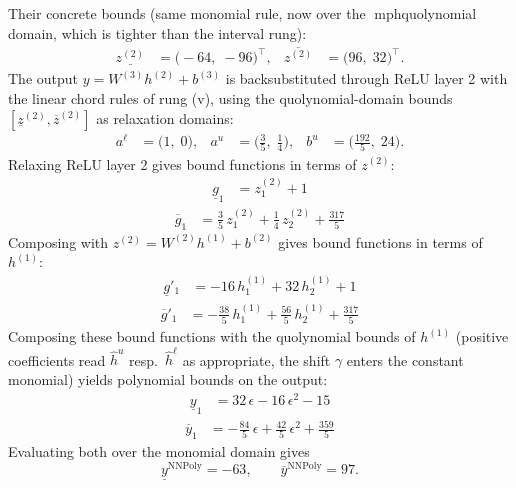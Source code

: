 \documentclass[11pt]{article}
\begin{document}
Their concrete bounds (same monomial rule, now over the mph{quolynomial} domain, which is tighter than the interval rung):
\begin{align*}
\underline{z^{(2)}} &= \bigl(-64,\; -96\bigr)^{\!\top}, & \overline{z^{(2)}} &= \bigl(96,\; 32\bigr)^{\!\top}.
\end{align*}
The output $y = W^{(3)} h^{(2)} + b^{(3)}$ is backsubstituted through ReLU layer 2 with the linear chord rules of rung (v), using the quolynomial-domain bounds
$[\underline{z}^{(2)}, \overline{z}^{(2)}]$ as relaxation domains:
\begin{align*}
a^{\ell} &= \bigl(1,\; 0\bigr), & a^{u} &= \bigl(\frac{3}{5},\; \frac{1}{4}\bigr), & b^{u} &= \bigl(\frac{192}{5},\; 24\bigr).
\end{align*}
Relaxing ReLU layer 2 gives bound functions in terms of $z^{(2)}$:
\begin{align*}
\underline{g}_{1} &= z^{(2)}_{1} + 1
\end{align*}
\begin{align*}
\overline{g}_{1} &= \frac{3}{5}\,z^{(2)}_{1} + \frac{1}{4}\,z^{(2)}_{2} + \frac{317}{5}
\end{align*}
Composing with $z^{(2)} = W^{(2)} h^{(1)} + b^{(2)}$ gives bound functions in terms of $h^{(1)}$:
\begin{align*}
\underline{g}'_{1} &= -16\,h^{(1)}_{1} + 32\,h^{(1)}_{2} + 1
\end{align*}
\begin{align*}
\overline{g}'_{1} &= -\frac{38}{5}\,h^{(1)}_{1} + \frac{56}{5}\,h^{(1)}_{2} + \frac{317}{5}
\end{align*}
Composing these bound functions with the quolynomial bounds of $h^{(1)}$ (positive
coefficients read $\hat{h}^{u}$ resp.\ $\hat{h}^{\ell}$ as appropriate, the shift $\gamma$ enters the
constant monomial) yields polynomial bounds on the output:
\begin{align*}
\underline{y}_{1} &= 32\,\epsilon - 16\,\epsilon^2 - 15
\end{align*}
\begin{align*}
\overline{y}_{1} &= -\frac{84}{5}\,\epsilon + \frac{42}{5}\,\epsilon^2 + \frac{359}{5}
\end{align*}
Evaluating both over the monomial domain gives
\begin{equation*}
\underline{y}^{\text{NNPoly}} = -63, \qquad \overline{y}^{\text{NNPoly}} = 97.
\end{equation*}
\end{document}

